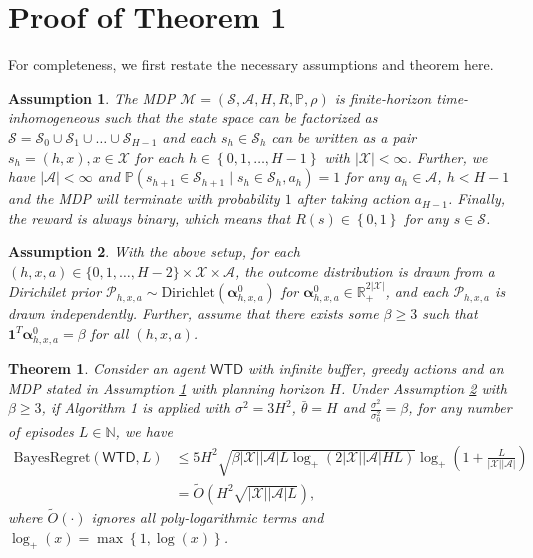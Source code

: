 \documentclass[letterpaper]{article} %
\newcommand{\Sp}[1]{\left(#1\right)}
\newcommand{\Bp}[1]{\left\{#1\right\}}
\newcommand{\abs}[1]{\left|#1\right|}
\newcommand{\Prob}{\mathbb{P}}
\newcommand{\R}{\mathbb{R}}
\newtheorem{theorem}{Theorem}
\newtheorem{assumption}{Assumption}
\theoremstyle{definition}
\begin{document}
\setcounter{assumption}{0}
\setcounter{theorem}{0}
\setcounter{lemma}{0}

\section{Proof of Theorem 1}
For completeness, we first restate the necessary assumptions and theorem here.
\begin{assumption}
    \label{assume:mdp}
    The MDP $\mathcal{M}=\Sp{\mathcal{S}, \mathcal{A}, H, R, \Prob, \rho}$ is finite-horizon time-inhomogeneous such that the state space can be factorized as $\mathcal{S}=\mathcal{S}_0\cup\mathcal{S}_1\cup\dots\cup\mathcal{S}_{H-1}$ and each $s_h\in \mathcal{S}_h$ can be written as a pair $s_h=\Sp{h, x}, x\in\mathcal{X}$ for each $h\in\Bp{0, 1, \dots, H-1}$ with $\abs{\mathcal{X}}<\infty$. Further, we have $\abs{\mathcal{A}}<\infty$ and $\Prob\Sp{s_{h+1}\in\mathcal{S}_{h+1}\mid s_h\in\mathcal{S}_h, a_h}=1$ for any $a_h\in\mathcal{A}$, $h<H-1$ and the MDP will terminate with probability $1$ after taking action $a_{H-1}$. Finally, the reward is always binary, which means that $R\Sp{s}\in\Bp{0, 1}$ for any $s\in\mathcal{S}$.
\end{assumption}
\begin{assumption}
	\label{assume:dir}
	With the above setup, for each $(h, x, a) \in \{0, 1, \dots, H - 2\} \times \mathcal{X} \times \mathcal{A}$, the outcome distribution is drawn from a Dirichilet prior $\mathcal{P}_{h, x, a}\sim\mathrm{Dirichlet}\Sp{\bm{\alpha}^0_{h, x, a}}$ for $\bm{\alpha}^0_{h, x, a} \in \R_{+}^{2 \abs{\mathcal{X}}}$, and each $\mathcal{P}_{h, x, a}$ is drawn independently. Further, assume that there exists some $\beta\geq 3$ such that $\bm{1}^T\bm{\alpha}^0_{h, x, a}=\beta$ for all $\Sp{h, x, a}$. 
\end{assumption}
\begin{theorem}
	\label{theo:regret}
	Consider an agent $\mathsf{WTD}$ with infinite buffer, greedy actions and an MDP stated in Assumption \ref{assume:mdp} with planning horizon $H$. Under Assumption \ref{assume:dir} with $\beta\geq 3$, if Algorithm 1 is applied with $\sigma^2=3H^2$, $\bar{\theta}=H$ and $\frac{\sigma^2}{\sigma_0^2}=\beta$, for any number of episodes $L\in\mathbb{N}$, we have
	\begin{align*}
	\mathrm{BayesRegret}\Sp{\mathsf{WTD}, L}&\leq 5H^2\sqrt{\beta\abs{\mathcal{X}}\abs{\mathcal{A}}L\log_+\Sp{2\abs{\mathcal{X}}\abs{\mathcal{A}}HL}}\log_+\Sp{1+\frac{L}{\abs{\mathcal{X}}\abs{\mathcal{A}}}}\\
	&=\widetilde{O}\Sp{H^2\sqrt{\abs{\mathcal{X}}\abs{\mathcal{A}}L}},
	\end{align*}
	where $\widetilde{O}\Sp{\cdot}$ ignores all poly-logarithmic terms and $\log_+\Sp{x}=\max\Bp{1, \log\Sp{x}}$.
\end{theorem}
\end{document}
